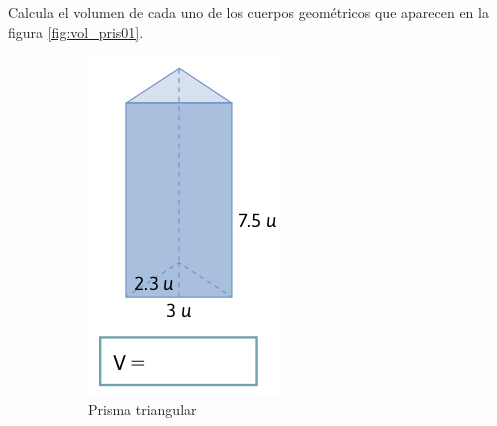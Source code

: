 Calcula el volumen de cada uno de los cuerpos geométricos que aparecen en la figura \ref{fig:vol_pris01}.

\begin{figure}[H]
    \centering
    \begin{subfigure}{.2\textwidth}
        \includegraphics[width=\linewidth]{../images/20230319051022}
        \caption{Prisma triangular}
        \label{sfig:20230319051022}
    \end{subfigure}
    \begin{subfigure}{.25\textwidth}

\end{subfigure}
\end{figure}
